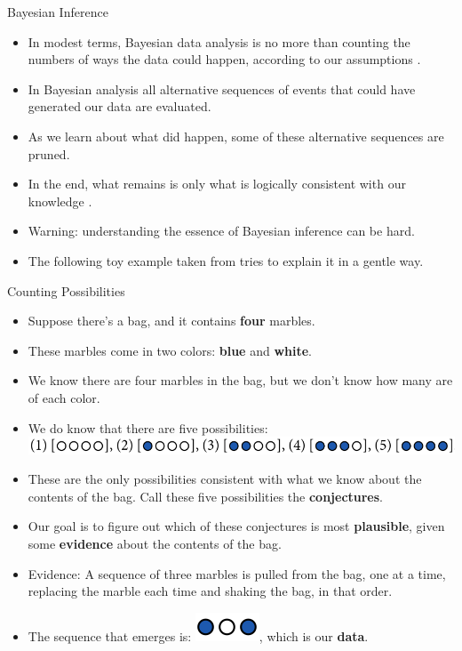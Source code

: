 \documentclass[handout]{beamer}
\begin{document}
\begin{frame}{Bayesian Inference}
\scriptsize{
\begin{itemize}
 \item In modest terms, Bayesian data analysis is no more than counting the numbers of ways
the data could happen, according to our assumptions \cite{mcelreath2020statistical}.
 \item In Bayesian analysis all alternative sequences of events that could have generated our data are evaluated.
 \item As we learn about what did happen, some of these alternative sequences are pruned. 
 \item In the end, what remains is only what is logically consistent with our knowledge \cite{mcelreath2020statistical}.
 \item Warning: understanding the essence of Bayesian inference can be hard.
 \item The following toy example taken from  \cite{mcelreath2020statistical} tries to explain it in a gentle way.
\end{itemize}
 } 
\end{frame}


\begin{frame}{Counting Possibilities}
\scriptsize{
\begin{itemize}
 \item Suppose there's a bag, and it contains \textbf{four} marbles.
 \item These marbles come in two colors: \textbf{blue} and \textbf{white}. 
 \item We know there are four marbles in the bag, but we don't know how many are of each color. 
 \item We do know that there are five possibilities: \includegraphics[scale=0.3]{pics/marbles1.png}
 \item These are the only possibilities consistent with what we know about the contents of the bag. Call these five possibilities the \textbf{conjectures}.
 \item Our goal is to figure out which of these conjectures is most \textbf{plausible}, given some \textbf{evidence} about the contents of the bag. 
 \item Evidence: A sequence of three marbles is pulled from the bag, one at a time, replacing the marble each time and shaking the bag, in that order. 
 \item The sequence that emerges is: \includegraphics[scale=0.5]{pics/marbles2.png}, which is our \textbf{data}. 
  
\end{itemize}
 } 
\end{frame}
\end{document}
